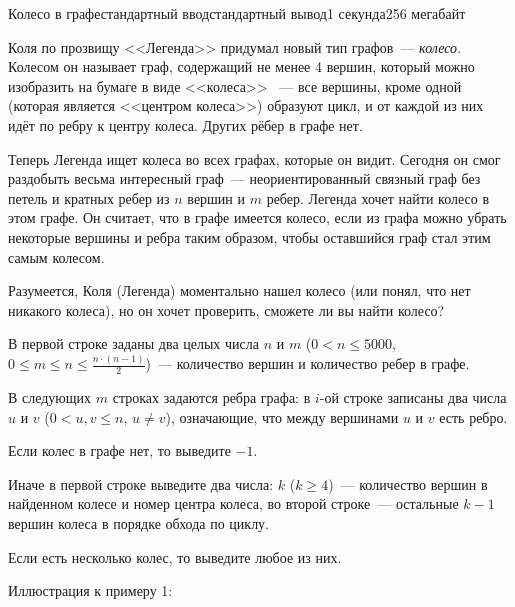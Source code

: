 \begin{problem}{Колесо в графе}{стандартный ввод}{стандартный вывод}{1 секунда}{256 мегабайт}

Коля по прозвищу <<Легенда>> придумал новый тип графов~--- \textit{колесо}. Колесом он называет граф, содержащий не менее 4 вершин, который можно изобразить на бумаге в виде <<колеса>>~ --- все вершины, кроме одной (которая является <<центром колеса>>) образуют цикл, и от каждой из них идёт по ребру к центру колеса. Других рёбер в графе нет.

Теперь Легенда ищет колеса во всех графах, которые он видит. Сегодня он смог раздобыть весьма интересный граф~--- неориентированный связный граф без петель и кратных ребер из $n$ вершин и $m$ ребер. Легенда хочет найти колесо в этом графе. Он считает, что в графе имеется колесо, если из графа можно убрать некоторые вершины и ребра таким образом, чтобы оставшийся граф стал этим самым колесом. 

Разумеется, Коля (Легенда) моментально нашел колесо (или понял, что нет никакого колеса), но он хочет проверить, сможете ли вы найти колесо? 

\InputFile
В первой строке заданы два целых числа $n$ и $m$ ($0 < n \leq 5000$, $0 \leq m \leq n \leq \frac{n \cdot (n-1)}{2}$)~--- количество вершин и количество ребер в графе.

В следующих $m$ строках задаются ребра графа: в $i$-ой строке записаны два числа $u$ и $v$ ($0 < u, v \leq n$, $u \neq v$), означающие, что между вершинами $u$ и $v$ есть ребро.

\OutputFile
Если колес в графе нет, то выведите $-1$.

Иначе в первой строке выведите два числа: $k$ ($k \ge 4$)~--- количество вершин в найденном колесе и номер центра колеса, во второй строке~--- остальные $k-1$ вершин колеса в порядке обхода по циклу.

Если есть несколько колес, то выведите любое из них.

\Examples

\begin{example}
%
\end{example}
\begin{example}
%
\end{example}

\Note
Иллюстрация к примеру 1: 


\end{problem}
